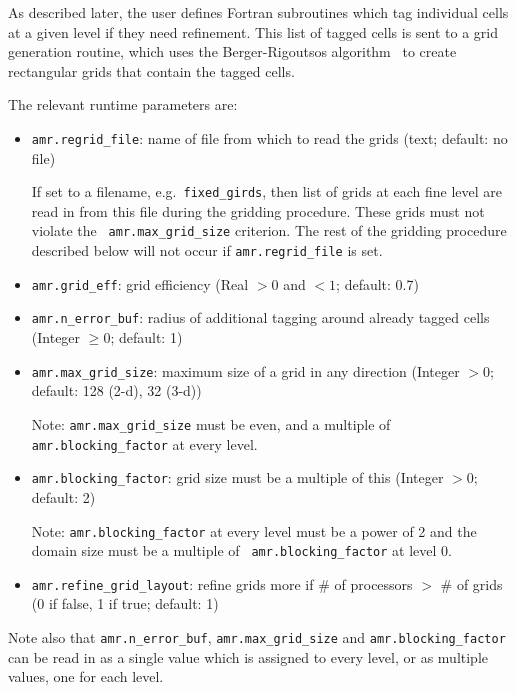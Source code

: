 As described later, the user defines Fortran subroutines which tag individual
cells at a given level if they need refinement.  This list of tagged cells is
sent to a grid generation routine, which uses the Berger-Rigoutsos algorithm~\cite{br-refine}
to create rectangular grids that contain the tagged cells.   

The relevant runtime parameters are:
\begin{itemize}
\item {\tt amr.regrid\_file}: name of file from which to read the grids (text; default: no file)

  If set to a filename, e.g.\ {\tt fixed\_girds}, then list of grids
  at each fine level are read in from this file during the gridding
  procedure. These grids must not violate the {\tt
  amr.max\_grid\_size} criterion.  The rest of the gridding procedure
  described below will not occur if {\tt amr.regrid\_file} is set.

\item {\tt amr.grid\_eff}: grid efficiency (Real $>0$ and $<1$; default: 0.7)

\item {\tt amr.n\_error\_buf}: radius of additional tagging around already tagged cells
   (Integer $\geq 0$; default: 1)

\item {\tt amr.max\_grid\_size}: maximum size of a grid in any direction (Integer $> 0$;
   default: 128 (2-d), 32 (3-d))

   Note: {\tt amr.max\_grid\_size} must be even, and a multiple of
   {\tt amr.blocking\_factor} at every level.
   
\item {\tt amr.blocking\_factor}:  grid size must be a multiple of this (Integer $> 0$; default: 2)

   Note: {\tt amr.blocking\_factor} at every level must be a power of
   2 and the domain size must be a multiple of {\tt
   amr.blocking\_factor} at level 0.
   
\item {\tt amr.refine\_grid\_layout}: refine grids more if \# of processors $>$ \# of grids
  (0 if false, 1 if true; default: 1) \\
\end{itemize}

Note also that {\tt amr.n\_error\_buf}, {\tt amr.max\_grid\_size} and
{\tt amr.blocking\_factor} can be read in as a single value which is
assigned to every level, or as multiple values, one for each level.

